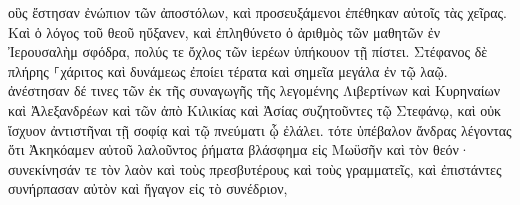 \documentclass{openreader}
\begin{document}
οὓς ἔστησαν ἐνώπιον τῶν ἀποστόλων, καὶ προσευξάμενοι ἐπέθηκαν αὐτοῖς τὰς χεῖρας. 
Καὶ ὁ λόγος τοῦ θεοῦ ηὔξανεν, καὶ ἐπληθύνετο ὁ ἀριθμὸς τῶν μαθητῶν ἐν Ἰερουσαλὴμ σφόδρα, πολύς τε ὄχλος τῶν ἱερέων ὑπήκουον τῇ πίστει. 
Στέφανος δὲ πλήρης ⸀χάριτος καὶ δυνάμεως ἐποίει τέρατα καὶ σημεῖα μεγάλα ἐν τῷ λαῷ. 
ἀνέστησαν δέ τινες τῶν ἐκ τῆς συναγωγῆς τῆς λεγομένης Λιβερτίνων καὶ Κυρηναίων καὶ Ἀλεξανδρέων καὶ τῶν ἀπὸ Κιλικίας καὶ Ἀσίας συζητοῦντες τῷ Στεφάνῳ, 
καὶ οὐκ ἴσχυον ἀντιστῆναι τῇ σοφίᾳ καὶ τῷ πνεύματι ᾧ ἐλάλει. 
τότε ὑπέβαλον ἄνδρας λέγοντας ὅτι Ἀκηκόαμεν αὐτοῦ λαλοῦντος ῥήματα βλάσφημα εἰς Μωϋσῆν καὶ τὸν θεόν· 
συνεκίνησάν τε τὸν λαὸν καὶ τοὺς πρεσβυτέρους καὶ τοὺς γραμματεῖς, καὶ ἐπιστάντες συνήρπασαν αὐτὸν καὶ ἤγαγον εἰς τὸ συνέδριον, 
\end{document}
